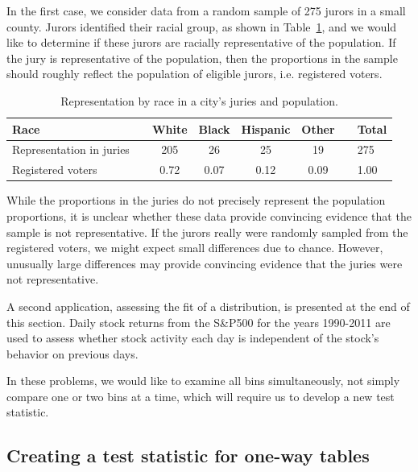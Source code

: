 
In the first case, we consider data from a random sample of 275 jurors in a small county. Jurors identified their racial group, as shown in Table~\ref{juryRepresentationAndCityRepresentationForRace}, and we would like to determine if these jurors are racially representative of the population. If the jury is representative of the population, then the proportions in the sample should roughly reflect the population of eligible jurors, i.e. registered voters.

\begin{table}[h]
\centering
\begin{tabular}{ll ccc c ll}
\hline
Race	 & \hspace{2mm} & White & Black & Hispanic & Other & \hspace{2mm} & Total \\
\hline
Representation in juries &	& 205 & 26 & 25 & 19 & & 275 \\
Registered voters	 & 		& 0.72 & 0.07 & 0.12 & 0.09 & & 1.00 \\
\hline
\end{tabular}
\caption{Representation by race in a city's juries and population.}
\label{juryRepresentationAndCityRepresentationForRace}
\end{table}

While the proportions in the juries do not precisely represent the population proportions, it is unclear whether these data provide convincing evidence that the sample is not representative. If the jurors really were randomly sampled from the registered voters, we might expect small differences due to chance. However, unusually large differences may provide convincing evidence that the juries were not representative.

A second application, assessing the fit of a distribution, is presented at the end of this section. Daily stock returns from the S\&P500 for the years 1990-2011 are used to assess whether stock activity each day is independent of the stock's behavior on previous days.

In these problems, we would like to examine all bins simultaneously, not simply compare one or two bins at a time, which will require us to develop a new test statistic.


\subsection{Creating a test statistic for one-way tables}

